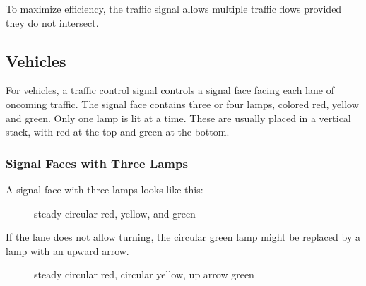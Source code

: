\documentclass[letterpaper,twoside]{article}
\begin{document}
To maximize efficiency, the traffic signal allows multiple traffic flows
provided they do not intersect.

\subsection{Vehicles}
For vehicles, a traffic control signal controls a signal face facing each
lane of oncoming traffic.  The signal face contains three or four lamps,
colored red, yellow and green.  Only one lamp is lit at a time.
These are usually placed in a vertical stack, with red at the top and green
at the bottom.

\subsubsection{Signal Faces with Three Lamps}

A signal face with three lamps looks like this:

\begin{figure}[H]
           {\caption{steady circular red, yellow, and
               green}\label{fig:three_A}}
\end{figure}

If the lane does not allow turning, the circular
green lamp might be replaced by a lamp with an upward arrow.

\begin{figure}[H]
           {\caption{steady circular red, circular yellow, up arrow
               green}\label{fig:three_B}}
\end{figure}
\end{document}
